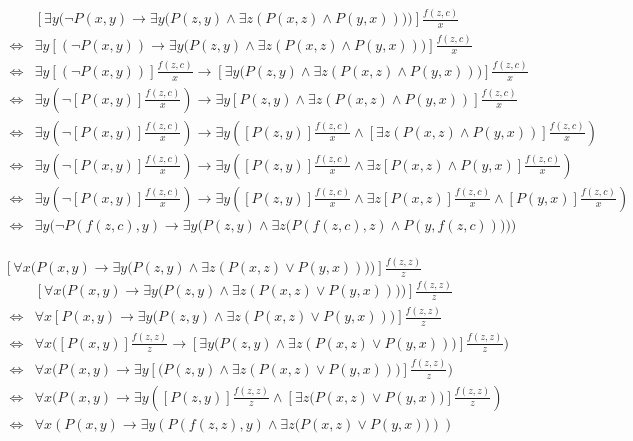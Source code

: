 \documentclass[11pt,a4paper]{article}
\begin{document}
\apartnb
\[\begin{array}{rl}
&\left[\exists y\big(\neg P(x,y)\to\exists y\big(P(z,y)\wedge\exists z(P(x,z)\wedge P(y,x))\big)\big)\right]\frac{f(z,c)}x\\
\Longleftrightarrow&\exists y\left[(\neg P(x,y))\to\exists y\big(P(z,y)\wedge\exists z(P(x,z)\wedge P(y,x))\big)\right]\frac{f(z,c)}x\\
\Longleftrightarrow&\exists y\left[(\neg P(x,y))\right]\frac{f(z,c)}x\to\left[\exists y\big(P(z,y)\wedge\exists z(P(x,z)\wedge P(y,x))\big)\right]\frac{f(z,c)}x\\
\Longleftrightarrow&\exists y\left(\neg [P(x,y)]\frac{f(z,c)}x\right)\to\exists y\left[P(z,y)\wedge\exists z(P(x,z)\wedge P(y,x))\right]\frac{f(z,c)}x\\
\Longleftrightarrow&\exists y\left(\neg [P(x,y)]\frac{f(z,c)}x\right)\to\exists y\left(\left[P(z,y)\right]\frac{f(z,c)}x\wedge\left[\exists z(P(x,z)\wedge P(y,x))\right]\frac{f(z,c)}x\right)\\
\Longleftrightarrow&\exists y\left(\neg [P(x,y)]\frac{f(z,c)}x\right)\to\exists y\left(\left[P(z,y)\right]\frac{f(z,c)}x\wedge\exists z\left[P(x,z)\wedge P(y,x)\right]\frac{f(z,c)}x\right)\\
\Longleftrightarrow&\exists y\left(\neg [P(x,y)]\frac{f(z,c)}x\right)\to\exists y\left(\left[P(z,y)\right]\frac{f(z,c)}x\wedge\exists z[P(x,z)]\frac{f(z,c)}x\wedge [P(y,x)]\frac{f(z,c)}x\right)\\
\Longleftrightarrow&\exists y\big(\neg P(f(z,c),y)\to\exists y\big(P(z,y)\wedge\exists z\big(P(f(z,c),z)\wedge P(y,f(z,c))\big)\big)\big)\\
\end{array}\]

\qpartnb
$\left[\forall x\big(P(x,y)\to\exists y\big(P(z,y)\wedge\exists z(P(x,z)\vee P(y,x))\big)\big)\right]\frac{f(z,z)}{z}$\\

\apartnb
\[\begin{array}{rl}
&\left[\forall x\big(P(x,y)\to\exists y\big(P(z,y)\wedge\exists z(P(x,z)\vee P(y,x))\big)\big)\right]\frac{f(z,z)}{z}\\
\Longleftrightarrow&\forall x\left[P(x,y)\to\exists y\big(P(z,y)\wedge\exists z(P(x,z)\vee P(y,x))\big)\right]\frac{f(z,z)}{z}\\
\Longleftrightarrow&\forall x\big([P(x,y)]\frac{f(z,z)}{z}\to\left[\exists y\big(P(z,y)\wedge\exists z(P(x,z)\vee P(y,x))\big)\right]\frac{f(z,z)}{z}\big)\\
\Longleftrightarrow&\forall x\big(P(x,y)\to\exists y\left[\big(P(z,y)\wedge\exists z(P(x,z)\vee P(y,x))\big)\right]\frac{f(z,z)}{z}\big)\\
\Longleftrightarrow&\forall x\big(P(x,y)\to\exists y\left([P(z,y)]\frac{f(z,z)}{z}\wedge\left[\exists z\big(P(x,z)\vee P(y,x)\big)\right]\frac{f(z,z)}{z}\right)\\
\Longleftrightarrow&\forall x\left(P(x,y)\to\exists y\left(P(f(z,z),y)\wedge\exists z\big(P(x,z)\vee P(y,x))\right)\right)
\end{array}\]
\end{document}
